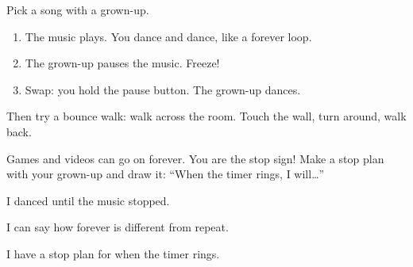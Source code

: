 
\begin{playathome}
Pick a song with a grown-up.
\begin{enumerate}[leftmargin=1.4em,itemsep=2pt]
  \item The music plays. You dance and dance, like a forever loop.
  \item The grown-up pauses the music. Freeze!
  \item Swap: you hold the pause button. The grown-up dances.
\end{enumerate}
Then try a bounce walk: walk across the room. Touch the wall, turn around, walk back.
\end{playathome}

\begin{playathome}
Games and videos can go on forever. You are the stop sign! Make a stop plan with your grown-up and draw it: \enquote{When the timer rings, I will\ldots}
\end{playathome}

\begin{selfcheck}
  \item I danced until the music stopped.
  \item I can say how forever is different from repeat.
  \item I have a stop plan for when the timer rings.
\end{selfcheck}
